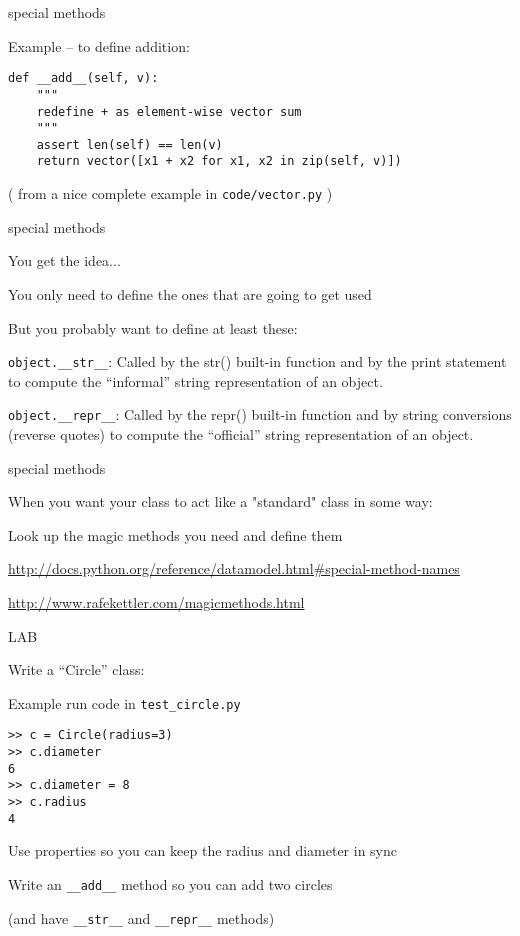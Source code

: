 \documentclass{beamer}
\begin{document}
\begin{frame}[fragile]{special methods}

{\Large Example -- to define addition:}

\begin{verbatim}
def __add__(self, v):
    """
    redefine + as element-wise vector sum
    """
    assert len(self) == len(v)
    return vector([x1 + x2 for x1, x2 in zip(self, v)])
\end{verbatim}

( from a nice complete example in \verb|code/vector.py| )

\end{frame} 


\begin{frame}[fragile]{special methods}

{\Large You get the idea...}

\vfill
{\Large You only need to define the ones that are going to get used}

\vfill
{\Large But you probably want to define at least these:}

\vfill
\verb|object.__str__|: Called by the str() built-in function and by the print statement to compute the “informal” string representation of an object.

\vfill
\verb|object.__repr__|: Called by the repr() built-in function and by string conversions (reverse quotes) to compute the “official” string representation of an object.

\end{frame} 

\begin{frame}[fragile]{special methods}

\vfill
{\Large When you want your class to act like a "standard" class in some way:}

\vfill
{\Large Look up the magic methods you need and define them}

\vfill
\url{http://docs.python.org/reference/datamodel.html#special-method-names}

\vfill
\url{http://www.rafekettler.com/magicmethods.html}
\end{frame} 

\begin{frame}[fragile]{LAB}

{Write a ``Circle'' class:}

Example run code in \verb|test_circle.py|

\begin{verbatim}
>> c = Circle(radius=3)
>> c.diameter
6
>> c.diameter = 8
>> c.radius 
4
\end{verbatim}
Use properties so you can keep the radius and diameter in sync

Write an \verb|__add__| method so you can add two circles

(and have \verb|__str__| and \verb|__repr__| methods)
\end{frame}
\end{document}
